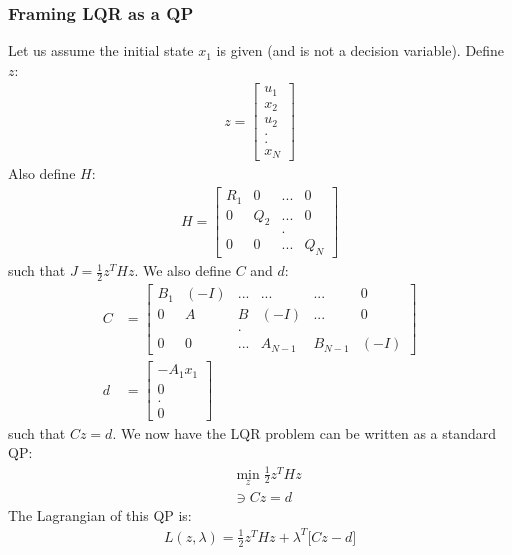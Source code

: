 \subsubsection{Framing LQR as a QP}
Let us assume the initial state $x_1$ is given (and is not a decision variable). Define $z$:
\begin{align}
    z = \begin{bmatrix}
       u_1 \\
       x_2 \\
       u_2 \\
       . \\
       . \\
       x_N
    \end{bmatrix}
\end{align}
Also define $H$:
\begin{align}
    H = \begin{bmatrix}
        R_1 & 0   & ... & 0 \\
        0   & Q_2 & ... & 0 \\
        \   & \   & .   & \ \\
        0   & 0   & ... & Q_N
    \end{bmatrix}
\end{align}
such that $J = \frac{1}{2} z^T H z$. We also define $C$ and $d$:
\begin{align}
    C &= \begin{bmatrix}
        B_1 & (-I)  & ...   & ...   & ...   & 0 \\
        0   & A     & B     & (-I)  & ...   & 0 \\
        \   & \     & .     & \ \\
        0   & 0     & ...   & A_{N-1} & B_{N-1} & (-I)
    \end{bmatrix} \\
    d &= \begin{bmatrix}
        -A_1 x_1 \\
        0 \\
        . \\
        0
    \end{bmatrix}
\end{align}
such that $C z = d$. We now have the LQR problem can be written as a standard QP:
\begin{align}
    &\min_{z} \frac{1}{2} z^T H z \\
    \ &\ni C z = d
\end{align}
The Lagrangian of this QP is:
\begin{align}
    L(z, \lambda) = \frac{1}{2} z^T H z + \lambda^T \big[ C z - d\big]
\end{align}
